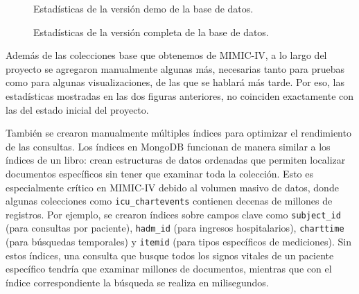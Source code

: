 \begin{figure}[H]
    \centering
    \caption{Estadísticas de la versión demo de la base de datos.}
    \label{fig:stats_demo}
\end{figure}

\begin{figure}[H]
    \centering
    \caption{Estadísticas de la versión completa de la base de datos.}
    \label{fig:stats_full}
\end{figure}


Además de las colecciones base que obtenemos de MIMIC-IV, a lo largo del proyecto se agregaron manualmente algunas más, necesarias tanto para pruebas como para algunas visualizaciones, de las que se hablará más tarde. Por eso, las estadísticas mostradas en las dos figuras anteriores, no coinciden exactamente con las del estado inicial del proyecto. 

También se crearon manualmente múltiples índices para optimizar el rendimiento de las consultas. Los índices en MongoDB funcionan de manera similar a los índices de un libro: crean estructuras de datos ordenadas que permiten localizar documentos específicos sin tener que examinar toda la colección. Esto es especialmente crítico en MIMIC-IV debido al volumen masivo de datos, donde algunas colecciones como \texttt{icu\_chartevents} contienen decenas de millones de registros. Por ejemplo, se crearon índices sobre campos clave como \texttt{subject\_id} (para consultas por paciente), \texttt{hadm\_id} (para ingresos hospitalarios), \texttt{charttime} (para búsquedas temporales) y \texttt{itemid} (para tipos específicos de mediciones). Sin estos índices, una consulta que busque todos los signos vitales de un paciente específico tendría que examinar millones de documentos, mientras que con el índice correspondiente la búsqueda se realiza en milisegundos.


